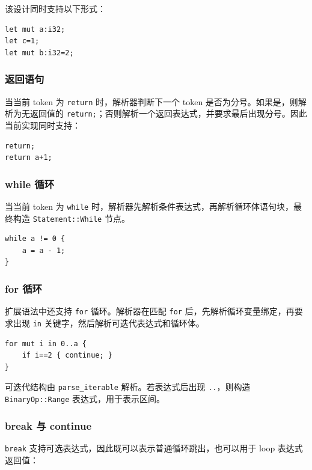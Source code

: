 \documentclass[UTF8,a4paper,12pt]{ctexart}
\begin{document}
该设计同时支持以下形式：

\begin{lstlisting}[caption={变量声明语句示例}]
let mut a:i32;
let c=1;
let mut b:i32=2;
\end{lstlisting}

\subsubsection{返回语句}

当当前 token 为 \texttt{return} 时，解析器判断下一个 token 是否为分号。如果是，则解析为无返回值的 \texttt{return;}；否则解析一个返回表达式，并要求最后出现分号。因此当前实现同时支持：

\begin{lstlisting}[caption={返回语句示例}]
return;
return a+1;
\end{lstlisting}

\subsubsection{while 循环}

当当前 token 为 \texttt{while} 时，解析器先解析条件表达式，再解析循环体语句块，最终构造 \texttt{Statement::While} 节点。

\begin{lstlisting}[caption={while 循环示例}]
while a != 0 {
    a = a - 1;
}
\end{lstlisting}

\subsubsection{for 循环}

扩展语法中还支持 \texttt{for} 循环。解析器在匹配 \texttt{for} 后，先解析循环变量绑定，再要求出现 \texttt{in} 关键字，然后解析可迭代表达式和循环体。

\begin{lstlisting}[caption={for 循环示例}]
for mut i in 0..a {
    if i==2 { continue; }
}
\end{lstlisting}

可迭代结构由 \texttt{parse\_iterable} 解析。若表达式后出现 \texttt{..}，则构造 \texttt{BinaryOp::Range} 表达式，用于表示区间。

\subsubsection{break 与 continue}

\texttt{break} 支持可选表达式，因此既可以表示普通循环跳出，也可以用于 loop 表达式返回值：
\end{document}
